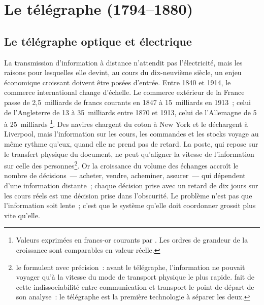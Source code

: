 \section{Le télégraphe (1794--1880)}\label{sec:telegraph}

\subsection{Le télégraphe optique et électrique}\label{subsec:telegraph}

La transmission d'information à distance n'attendit pas l'électricité, mais les raisons pour lesquelles elle devint, au cours du dix-neuvième siècle, un enjeu économique croissant doivent être posées d'entrée. Entre 1840 et 1914, le commerce international change d'échelle. Le commerce extérieur de la France passe de 2,5~milliards de francs courants en 1847 à 15~milliards en 1913~; celui de l'Angleterre de 13 à 35~milliards entre 1870 et 1913, celui de l'Allemagne de 5 à 25~milliards \parencite{mitchell_historical_2007}\footnote{Valeurs exprimées en francs-or courants par \textcite{mitchell_historical_2007}. Les ordres de grandeur de la croissance sont comparables en valeur réelle.}. Des navires chargent du coton à New York et le déchargent à Liverpool, mais l'information sur les cours, les commandes et les stocks voyage au même rythme qu'eux, quand elle ne prend pas de retard. La poste, qui repose sur le transfert physique du document, ne peut qu'aligner la vitesse de l'information sur celle des personnes\footnote{\textcite{juhasz_spinning_2018} le formulent avec précision~: avant le télégraphe, l'information ne pouvait voyager qu'à la vitesse du mode de transport physique le plus rapide. \textcite{carey_communication_1989} fait de cette indissociabilité entre communication et transport le point de départ de son analyse~: le télégraphe est la première technologie à séparer les deux.}. %
Or la croissance du volume des échanges accroît le nombre de décisions~--- acheter, vendre, acheminer, assurer~--- qui dépendent d'une information distante~; chaque décision prise avec un retard de dix jours sur les cours réels est une décision prise dans l'obscurité. Le problème n'est pas que l'information soit lente~; c'est que le système qu'elle doit coordonner grossit plus vite qu'elle.

